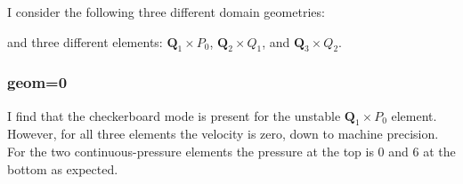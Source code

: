 I consider the following three different domain geometries:
\begin{center}

\end{center}
and three different elements: ${\bm Q}_1\times P_0$, ${\bm Q}_2\times Q_1$, and ${\bm Q}_3\times Q_2$.

\subsubsection*{geom=0}

I find that the checkerboard mode is present for the unstable ${\bm Q}_1\times P_0$
element. However, for all three elements the velocity is zero, down to machine precision.
For the two continuous-pressure elements the pressure at the top is 0 and 6 at the 
bottom as expected.

